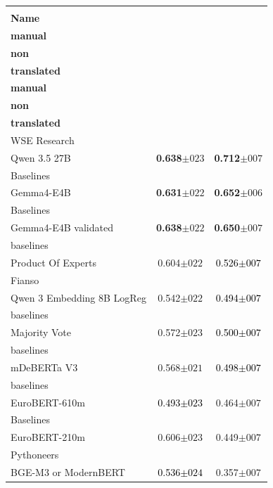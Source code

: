 \begin{tabularx}{\textwidth}{X | c c}
\hline
\makecell[b]{\textbf{Model} \\ \textbf{Name}} & \makecell[b]{\textbf{Addi} \\ \textbf{manual} \\ \textbf{non} \\ \textbf{translated}} & \makecell[b]{\textbf{PISA} \\ \textbf{manual} \\ \textbf{non} \\ \textbf{translated}} \\
\hline
WSE Research\\\subcatarrow{}Qwen 3.5 27B & \textbf{\textcolor{BrickRed}{0.638$\pm{}023$}} & \textbf{\textcolor{BrickRed}{0.712$\pm{}007$}} \\
Baselines\\\subcatarrow{}Gemma4-E4B & \textbf{\textcolor{BrickRed}{0.631$\pm{}022$}} & \textbf{\textcolor{White!50!BrickRed}{0.652$\pm{}006$}} \\
Baselines\\\subcatarrow{}Gemma4-E4B validated & \textbf{\textcolor{BrickRed}{0.638$\pm{}022$}} & \textbf{\textcolor{White!50!BrickRed}{0.650$\pm{}007$}} \\
baselines\\\subcatarrow{}Product Of Experts & \textcolor{White!50!BrickRed}{0.604$\pm{}022$} & \textcolor{Black}{0.526$\pm{}007$} \\
Fianso\\\subcatarrow{}Qwen 3 Embedding 8B LogReg & \textcolor{White!50!BrickRed}{0.542$\pm{}022$} & \textcolor{Black}{0.494$\pm{}007$} \\
baselines\\\subcatarrow{}Majority Vote & \textcolor{White!50!BrickRed}{0.572$\pm{}023$} & \textcolor{Black}{0.500$\pm{}007$} \\
baselines\\\subcatarrow{}mDeBERTa V3 & \textcolor{White!50!BrickRed}{0.568$\pm{}021$} & \textcolor{Black}{0.498$\pm{}007$} \\
baselines\\\subcatarrow{}EuroBERT-610m & \textcolor{Black}{0.493$\pm{}023$} & \textcolor{White!50!NavyBlue}{0.464$\pm{}007$} \\
Baselines\\\subcatarrow{}EuroBERT-210m & \textcolor{BrickRed}{0.606$\pm{}023$} & \textcolor{White!50!NavyBlue}{0.449$\pm{}007$} \\
Pythoneers\\\subcatarrow{}BGE-M3 or ModernBERT & \textcolor{Black}{0.536$\pm{}024$} & \textcolor{NavyBlue}{0.357$\pm{}007$} \\

\end{tabularx}

